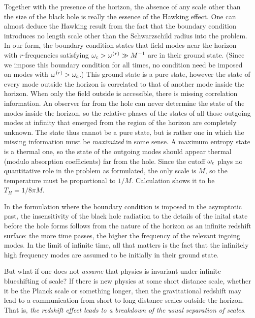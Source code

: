 Together with the presence of the horizon,
the absence of any scale other than the size of
the black hole is really the essence of the
Hawking effect.
One can almost deduce the Hawking result
from the fact that the boundary condition
introduces no length scale other than the
Schwarzschild radius into the problem.
In our form, the
boundary condition states that
field modes near the horizon with $r$-frequencies satisfying
$\omega_c>\omega^{(r)}\gg M^{-1}$ are in their ground state. (Since we impose
this boundary condition for all times, no condition need be
imposed on modes with $\omega^{(r)}>\omega_c$.) This ground state is a pure
state, however the state of every mode outside the horizon
is correlated to that of another mode inside the horizon.
When only the field outside is
accessible, there is missing correlation information.
An observer far from the hole can never determine
the state of the modes inside the horizon, so the
relative phases of the states of all those outgoing modes at
infinity that emerged from the region of the
horizon are completely unknown. The state thus cannot be a
pure state, but is rather one in which
the missing information must be {\it maximized} in
some sense. A maximum entropy state is a thermal
one, so the state of the outgoing modes should appear
thermal (modulo absorption coefficients) far from the hole. Since
the cutoff $\omega_c$ plays no quantitative role
in the problem as formulated, the only scale is
$M$, so the temperature must be proportional to
$1/M$. Calculation shows it to be $T_H=1/8\pi M$.

In the formulation where the boundary condition
is imposed in the asymptotic past, the insensitivity of
the black hole radiation to the details of the inital state
before the hole forms follows from the nature of the horizon as
an infinite redshift surface: the more time
passes, the higher the frequency of the relevant
ingoing modes. In the limit of infinite time,
all that matters is the fact that the infinitely
high frequency modes are assumed to be initially
in their ground state.

But what if one does not {\it assume} that
physics is invariant under infinite blueshifting of
scale? If there is new physics at some short distance scale,
whether it be the Planck scale or something longer, then the
gravitational redshift may lead to a communication
from short to long distance scales outside the horizon. That is,
{\it the redshift effect leads to a breakdown of the usual separation
of scales}.

